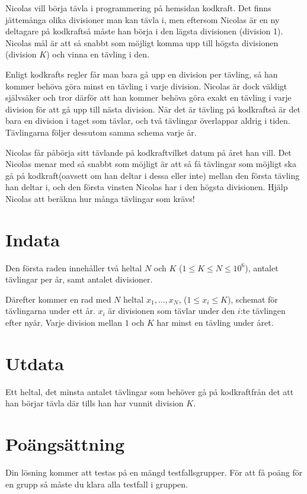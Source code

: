 \def\version{jury-2}
\newcommand{\cf}{kodkraft\texttrademark{}}
Nicolas vill börja tävla i programmering på hemsidan \cf.
Det finns jättemånga olika divisioner man kan tävla i, men eftersom Nicolas är en ny deltagare på \cf så måste han börja i den lägsta divisionen (division 1).
Nicolas mål är att så snabbt som möjligt komma upp till högsta divisionen (division $K$) och vinna en tävling i den.

Enligt kodkrafts\texttrademark{} regler får man bara gå upp en division per tävling, så han kommer behöva göra minst en tävling i varje division.
Nicolas är dock väldigt självsäker och tror därför att han kommer behöva göra exakt en tävling i varje division för att gå upp till nästa division.
När det är tävling på \cf så är det bara en division i taget som tävlar, och två tävlingar överlappar aldrig i tiden.
Tävlingarna följer dessutom samma schema varje år.

Nicolas får påbörja sitt tävlande på \cf vilket datum på året han vill.
Det Nicolas menar med så snabbt som möjligt är att så få tävlingar som möjligt ska gå på \cf (oavsett om han deltar i dessa eller inte) mellan den första tävling han deltar i, och den första vinsten Nicolas har i den högsta divisionen.
Hjälp Nicolas att beräkna hur många tävlingar som krävs!

\section*{Indata}
Den första raden innehåller två heltal $N$ och $K$ ($1 \leq K \leq N \leq 10^6$), antalet tävlingar per år, samt antalet divisioner.

Därefter kommer en rad med $N$ heltal $x_1, \dots, x_N$, ($1 \leq x_i \leq K$), schemat för tävlingarna under ett år.
$x_i$ är divisionen som tävlar under den $i$:te tävlingen efter nyår.
Varje division mellan $1$ och $K$ har minst en tävling under året.

\section*{Utdata}
Ett heltal, det minsta antalet tävlingar som behöver gå på \cf från det att han börjar tävla där tills han har vunnit division $K$.

\section*{Poängsättning}
Din lösning kommer att testas på en mängd testfallsgrupper.
För att få poäng för en grupp så måste du klara alla testfall i gruppen.

